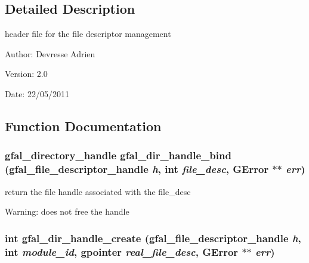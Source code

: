 \subsection{Detailed Description}
header file for the file descriptor management 

\begin{Desc}
\item[Author:]Devresse Adrien \end{Desc}
\begin{Desc}
\item[Version:]2.0 \end{Desc}
\begin{Desc}
\item[Date:]22/05/2011 \end{Desc}


\subsection{Function Documentation}
\subsubsection{\setlength{\rightskip}{0pt plus 5cm}gfal\_\-directory\_\-handle gfal\_\-dir\_\-handle\_\-bind (gfal\_\-file\_\-descriptor\_\-handle {\em h}, int {\em file\_\-desc}, GError $\ast$$\ast$ {\em err})}\label{gfal__common__filedescriptor_8h_23224901d9b8c37c00a8a9fda23f701a}


return the file handle associated with the file\_\-desc \begin{Desc}
\item[Warning:]does not free the handle \end{Desc}
\subsubsection{\setlength{\rightskip}{0pt plus 5cm}int gfal\_\-dir\_\-handle\_\-create (gfal\_\-file\_\-descriptor\_\-handle {\em h}, int {\em module\_\-id}, gpointer {\em real\_\-file\_\-desc}, GError $\ast$$\ast$ {\em err})}\label{gfal__common__filedescriptor_8h_bdd3af3590b09b87b43ad27aa9ed3eb0}


